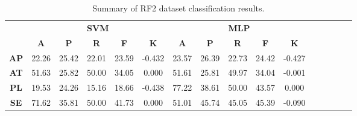 \begin{landscape}
\begin{table}[htbp]
\footnotesize
\centering
\caption{Summary of RF2 dataset classification results.}
\label{tab:base_female}
\begin{tabular}{|c|c|c|c|c|c|c|c|c|c|c|c|c|c|c|c|}
\hline
\multirow{2}{*}{}	& \multicolumn{5}{c|}{\textbf{SVM}}												& \multicolumn{5}{c|}{\textbf{MLP}}												\\ \cline{2-11} 
					& \textbf{A}	& \textbf{P}	& \textbf{R}	& \textbf{F}	& \textbf{K}	& \textbf{A}	& \textbf{P}	& \textbf{R}	& \textbf{F}	& \textbf{K}	\\ \hline
\textbf{AP}			& 22.26			& 25.42			& 22.01			& 23.59			& -0.432			& 23.57			& 26.39			& 22.73			& 24.42			& -0.427			\\ \hline
\textbf{AT}			& 51.63			& 25.82			& 50.00			& 34.05			& 0.000			& 51.61			& 25.81			& 49.97			& 34.04			& -0.001			\\ \hline
\textbf{PL}			& 19.53			& 24.26			& 15.16			& 18.66			& -0.438			& 77.22			& 38.61			& 50.00			& 43.57			& 0.000			\\ \hline
\textbf{SE}			& 71.62			& 35.81			& 50.00			& 41.73			& 0.000			& 51.01			& 45.74			& 45.05			& 45.39			& -0.090			\\ \hline
\end{tabular}
\end{table}
\end{landscape}